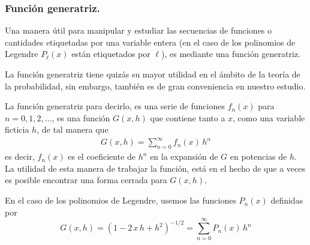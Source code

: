 \subsubsection{Función generatriz.}
Una manera útil para manipular y estudiar las secuencias de funciones o cantidades etiquetadas por una variable entera (en el caso de los polinomios de Legendre $P_{\ell} (x)$ están etiquetados por $\ell$), es mediante una función generatriz. 
\par
La función generatriz tiene quizás su mayor utilidad en el ámbito de la teoría de la probabilidad, sin embargo, también es de gran conveniencia en nuestro estudio.
\par
La función generatriz para decirlo, es una serie de funciones $f_{n} (x)$ para $n = 0, 1, 2,\ldots$, es una función $G (x, h)$ que contiene tanto a $x$, como una variable ficticia $h$, de tal manera que
\begin{align*}
G(x,h) = \sum_{n=0}^{\infty} f_{n} (x) \, h^{n}
\end{align*}
es decir, $f_{n}(x)$ es el coeficiente de $h^{n}$ en la expansión de $G$ en potencias de $h$. La utilidad de esta manera de trabajar la función, está en el hecho de que a veces es posible encontrar una forma cerrada para $G(x,h)$.
\par
En el caso de los polinomios de Legendre, usemos las funciones $P_{n}(x)$ definidas por
\begin{equation}
G(x,h) = (1 - 2 \, x \, h + h^{2})^{-1/2} =  \sum_{n=0}^{\infty} P_{n}(x) \, h^{n}
\label{eq:ecuacion_18_15}
\end{equation}
